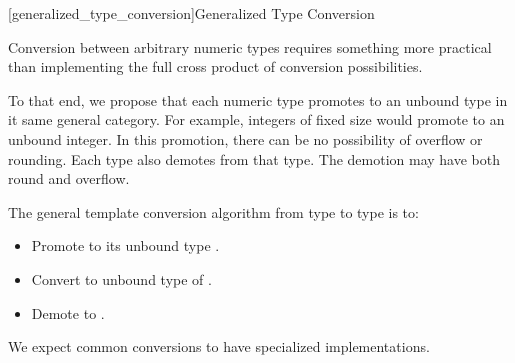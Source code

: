 
[generalized_type_conversion]{Generalized Type Conversion}

Conversion between arbitrary numeric types requires something more practical than implementing the full cross product of conversion possibilities.

To that end, we propose that each numeric type promotes to an unbound type in it same general category. For example, integers of fixed size would promote to an unbound integer. In this promotion, there can be no possibility of overflow or rounding. Each type also demotes from that type. The demotion may have both round and overflow.

The general template conversion algorithm from type  to type  is to:

\begin{itemize}
\item Promote  to its unbound type .
\item Convert  to unbound type  of .
\item Demote  to .
\end{itemize}

We expect common conversions to have specialized implementations.
